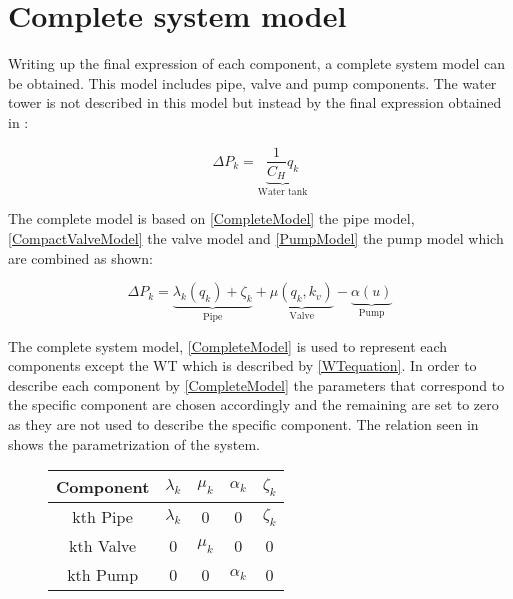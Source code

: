 \section{Complete system model} 
\label{CompleteSystemModel}

Writing up the final expression of each component, a complete system model can be obtained. This model includes pipe, valve and pump components. The water tower is not described in this model but instead by the final expression obtained in :

\begin{equation}
  \label{CompleteWTModel}
  \Delta P_k = \underbrace{\frac{1}{C_H}q_k}_\text{Water tank} 
\end{equation}


 The complete model is based on \eqref{CompleteModel} the pipe model, \eqref{CompactValveModel} the valve model and \eqref{PumpModel} the pump model which are combined as shown:

\begin{equation}
  \label{CompleteModel}
  \Delta P_k = \underbrace{\lambda_k (q_k) + \zeta_k}_\text{Pipe} + \underbrace{\mu (q_k, k_v)}_\text{Valve} - \underbrace{\alpha (u)}_\text{Pump} 
\end{equation}



The complete system model, \eqref{CompleteModel} is used to represent each components except the WT which is described by \eqref{WTequation}. In order to describe each component by \eqref{CompleteModel} the parameters that correspond to the specific component are chosen accordingly and the remaining are set to zero as they are not used to describe the specific component. 
The relation seen in  shows the parametrization of the system.

\begin{figure}[H]
	\centering
\begin{tabular}{c|cccc} 
  			\bfseries Component    &     $\lambda_k$    &    $\mu_k$    &   $\alpha_k$    &  $\zeta_k$  		\\ \hline
			kth Pipe		  	   &     $\lambda_k$    &    0          &   0             &  $\zeta_k$   	    \\ 
			kth Valve              &     0              &    $\mu_k$    &   0 		      &  0    				\\ 
			kth Pump 		       &     0              &    0          &   $\alpha_k$    &  0    			    
\end{tabular}
		\label{tab:parametrization_model}

\end{figure}	

